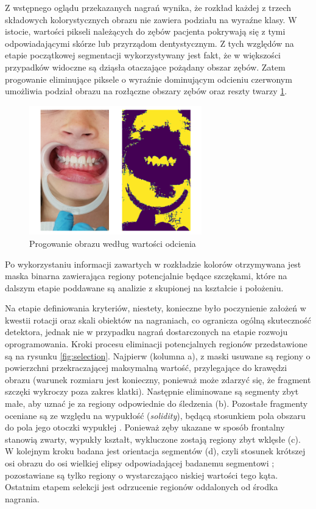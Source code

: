 Z wstępnego oglądu przekazanych nagrań wynika, że rozkład każdej z trzech składowych kolorystycznych obrazu nie zawiera podziału na wyraźne klasy. W istocie, wartości pikseli należących do zębów pacjenta pokrywają się z tymi odpowiadającymi skórze lub przyrządom dentystycznym. Z tych względów na etapie początkowej segmentacji wykorzystywany jest fakt, że w większości przypadków widoczne są dziąsła otaczające pożądany obszar zębów. Zatem progowanie eliminujące piksele o wyraźnie dominującym odcieniu czerwonym umożliwia podział obrazu na rozłączne obszary zębów oraz reszty twarzy \ref{fig:threshold}.

\begin{figure}
    \centering\includegraphics[width=75mm,scale=1.5]{figures/threshold.png}
    \caption{Progowanie obrazu według wartości odcienia}
    \label{fig:threshold}
\end{figure}

Po wykorzystaniu informacji zawartych w rozkładzie kolorów otrzymywana jest maska binarna zawierająca regiony potencjalnie będące szczękami, które na dalszym etapie poddawane są analizie z skupionej na kształcie i położeniu.  

Na etapie definiowania kryteriów, niestety, konieczne było poczynienie założeń w kwestii rotacji oraz skali obiektów na nagraniach, co ogranicza ogólną skuteczność detektora, jednak nie w przypadku nagrań dostarczonych na etapie rozwoju oprogramowania.  
Kroki procesu eliminacji potencjalnych regionów przedstawione są na rysunku \ref{fig:selection}. Najpierw (kolumna a), z maski usuwane są regiony o powierzchni przekraczającej maksymalną wartość,  przylegające do krawędzi obrazu (warunek rozmiaru jest konieczny, ponieważ może zdarzyć się, że fragment szczęki wykroczy poza zakres klatki). Następnie eliminowane są segmenty zbyt małe, aby uznać je za regiony odpowiednie do śledzenia (b). Pozostałe fragmenty oceniane są ze względu na wypukłość (\emph{solidity}), będącą stosunkiem pola obszaru do pola jego otoczki wypukłej \cite{regionprops}. Ponieważ zęby ukazane w sposób frontalny stanowią zwarty, wypukły kształt, wykluczone zostają regiony zbyt wklęsłe (c). W kolejnym kroku badana jest orientacja segmentów (d), czyli stosunek krótszej osi obrazu do osi wielkiej elipsy odpowiadającej badanemu segmentowi \cite{regionprops}; pozostawiane są tylko regiony o wystarczająco niskiej wartości tego kąta. Ostatnim etapem selekcji jest odrzucenie regionów oddalonych od środka nagrania.

